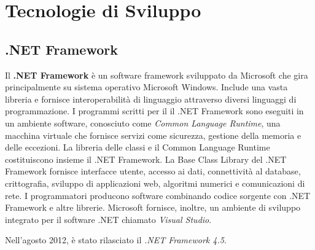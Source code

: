 \clearpage{\pagestyle{empty}\cleardoublepage}

\section{Tecnologie di Sviluppo}
\subsection{.NET Framework}
Il \textbf{.NET Framework} è un software framework sviluppato da Microsoft che gira principalmente su sistema operativo Microsoft Windows.
Include una vasta libreria e fornisce interoperabilità di linguaggio attraverso diversi linguaggi di programmazione.
I programmi scritti per il il .NET Framework sono eseguiti in un ambiente software, conosciuto come \emph{Common Language Runtime}, una macchina virtuale che fornisce servizi come sicurezza, gestione della memoria e delle eccezioni.
La libreria delle classi e il Common Language Runtime costituiscono insieme il .NET Framework.
La Base Class Library del .NET Framework fornisce interfacce utente, accesso ai dati, connettività al database, crittografia, sviluppo di applicazioni web, algoritmi numerici e comunicazioni di rete.
I programmatori producono software combinando codice sorgente con .NET Framework e altre librerie.
Microsoft fornisce, inoltre, un ambiente di sviluppo integrato per il software .NET chiamato \emph{Visual Studio}.

Nell'agosto 2012, è stato rilasciato il \emph{.NET Framework 4.5}.

